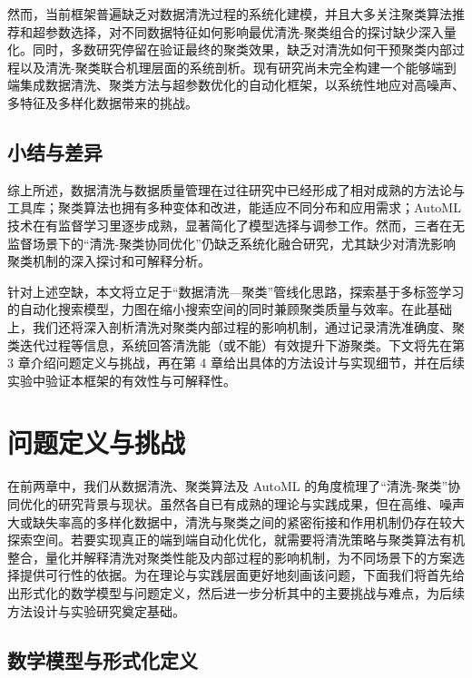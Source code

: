\documentclass[10pt]{article} %
\numberwithin{equation}{section}
\begin{document}
然而，当前框架普遍缺乏对数据清洗过程的系统化建模，并且大多关注聚类算法推荐和超参数选择，对不同数据特征如何影响最优清洗-聚类组合的探讨缺少深入量化。同时，多数研究停留在验证最终的聚类效果，缺乏对清洗如何干预聚类内部过程以及清洗-聚类联合机理层面的系统剖析。现有研究尚未完全构建一个能够端到端集成数据清洗、聚类方法与超参数优化的自动化框架，以系统性地应对高噪声、多特征及多样化数据带来的挑战。

\subsection{小结与差异}
综上所述，数据清洗与数据质量管理在过往研究中已经形成了相对成熟的方法论与工具库；聚类算法也拥有多种变体和改进，能适应不同分布和应用需求；AutoML 技术在有监督学习里逐步成熟，显著简化了模型选择与调参工作。然而，三者在无监督场景下的“清洗-聚类协同优化”仍缺乏系统化融合研究，尤其缺少对清洗影响聚类机制的深入探讨和可解释分析。

针对上述空缺，本文将立足于“数据清洗—聚类”管线化思路，探索基于多标签学习的自动化搜索模型，力图在缩小搜索空间的同时兼顾聚类质量与效率。在此基础上，我们还将深入剖析清洗对聚类内部过程的影响机制，通过记录清洗准确度、聚类迭代过程等信息，系统回答清洗能（或不能）有效提升下游聚类。下文将先在第 3 章介绍问题定义与挑战，再在第 4 章给出具体的方法设计与实现细节，并在后续实验中验证本框架的有效性与可解释性。



\section{问题定义与挑战}\label{sec:problem-and-model}

在前两章中，我们从数据清洗、聚类算法及 AutoML 的角度梳理了“清洗-聚类”协同优化的研究背景与现状。虽然各自已有成熟的理论与实践成果，但在高维、噪声大或缺失率高的多样化数据中，清洗与聚类之间的紧密衔接和作用机制仍存在较大探索空间。若要实现真正的端到端自动化优化，就需要将清洗策略与聚类算法有机整合，量化并解释清洗对聚类性能及内部过程的影响机制，为不同场景下的方案选择提供可行性的依据。为在理论与实践层面更好地刻画该问题，下面我们将首先给出形式化的数学模型与问题定义，然后进一步分析其中的主要挑战与难点，为后续方法设计与实验研究奠定基础。

\subsection{数学模型与形式化定义}\label{subsec:formal-definition}
\end{document}
